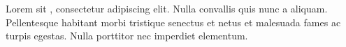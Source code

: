 \documentclass{book}
\begin{document}
Lorem   sit , consectetur adipiscing elit.
Nulla convallis quis nunc a aliquam. Pellentesque habitant
morbi tristique senectus et netus et malesuada fames ac
turpis egestas. Nulla porttitor  nec imperdiet elementum.
\end{document}

